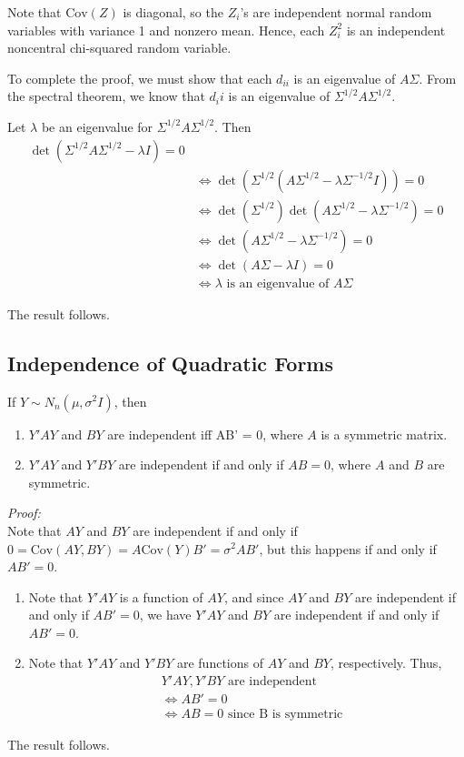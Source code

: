 \documentclass[12pt]{article}
\newcommand{\Cov}{\mathrm{Cov}}
\numberwithin{equation}{section}
\begin{document}
Note that $\Cov(Z)$ is diagonal, so the $Z_i$'s are independent normal random variables with variance 1 and nonzero mean. Hence, each $Z_i^2$ is an independent noncentral chi-squared random variable.

To complete the proof, we must show that each $d_{ii}$ is an eigenvalue of $A\Sigma$. From the spectral theorem, we know that $d_ii$ is an eigenvalue of $\Sigma^{1/2} A \Sigma^{1/2}$. 

Let $\lambda$ be an eigenvalue for $\Sigma^{1/2} A \Sigma^{1/2}$. Then 
\begin{align*} 
  \det(\Sigma^{1/2} A \Sigma^{1/2} - \lambda I) = 0 & \\
  & \iff \det(\Sigma^{1/2} (A \Sigma^{1/2} - \lambda \Sigma^{-1/2} I)) = 0 \\
  & \iff \det(\Sigma^{1/2}) \det(A \Sigma^{1/2} - \lambda \Sigma^{-1/2}) = 0 \\
  & \iff \det(A\Sigma^{1/2} - \lambda \Sigma^{-1/2}) = 0 \\
  & \iff \det(A \Sigma - \lambda I) = 0 \\
  & \iff \lambda \text{ is an eigenvalue of } A\Sigma
\end{align*}

The result follows.

\subsection{Independence of Quadratic Forms}
If $Y \sim N_n(\mu, \sigma^2 I)$, then
\begin{enumerate}
  \item $Y'AY$ and $BY$ are independent iff AB' = 0, where $A$ is a symmetric matrix.
  \item $Y'AY$ and $Y'BY$ are independent if and only if $AB = 0$, where $A$ and $B$ are symmetric.
\end{enumerate}

\textit{Proof:} \\
Note that $AY$ and $BY$ are independent if and only if $0 = \Cov(AY, BY) = A \Cov(Y) B' = \sigma^2 A B'$, but this happens if and only if $AB' = 0$.
\begin{enumerate}
  \item Note that $Y'AY$ is a function of $AY$, and since $AY$ and $BY$ are independent if and only if $AB' = 0$, we have $Y'AY$ and $BY$ are independent if and only if $AB' = 0$.
  \item Note that $Y'AY$ and $Y'BY$ are functions of $AY$ and $BY$, respectively. Thus,
  \begin{align*}
    & Y'AY, Y'BY \text{ are independent} \\
    & \iff AB' = 0 \\
    & \iff AB = 0 \text{ since B is symmetric}
  \end{align*}
\end{enumerate}
The result follows.
\end{document}
